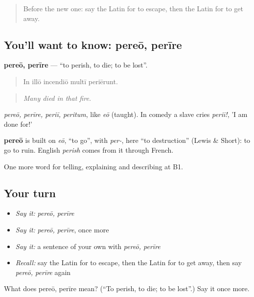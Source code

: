 \begin{quote}
Before the new one: say the Latin for to escape, then the Latin for to get away.
\end{quote}

\subsection*{You'll want to know: pereō, perīre}
\textbf{pereō, perīre} — \textquotedblleft{}to perish, to die; to be lost\textquotedblright{}.

\begin{quote}
In illō incendiō multī periērunt.
\end{quote}

\begin{quote}
\emph{Many died in that fire.}
\end{quote}

\emph{pereō, perīre, periī, peritum}, like \emph{eō} (taught). In comedy a slave cries \emph{periī!}, 'I am done for!'

\begin{cousinweb}
\textbf{pereō} is built on \emph{eō}, \textquotedblleft{}to go\textquotedblright{}, with \emph{per-}, here \textquotedblleft{}to destruction\textquotedblright{} (Lewis \& Short): to go to ruin. English \emph{perish} comes from it through French.
\end{cousinweb}

\begin{grammarlens}[title={What you've built}]
One more word for telling, explaining and describing at B1.
\end{grammarlens}

\subsection*{Your turn}
\begin{itemize}
\raggedright
  \item \emph{Say it:} \emph{pereō, perīre}
  \item \emph{Say it:} \emph{pereō, perīre}, once more
  \item \emph{Say it:} a sentence of your own with \emph{pereō, perīre}
  \item \emph{Recall:} say the Latin for to escape, then the Latin for to get away, then say \emph{pereō, perīre} again
\end{itemize}

\begin{tcolorbox}[breakable,colback=teal!4,colframe=teal!35!black,title={Before you move on}]
What does pereō, perīre mean? (\textquotedblleft{}To perish, to die; to be lost\textquotedblright{}.) Say it once more.
\end{tcolorbox}
